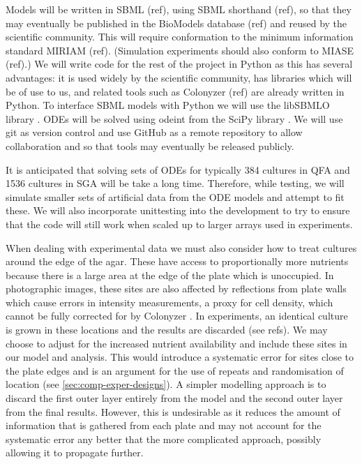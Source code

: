 Models will be written in SBML (ref), using SBML shorthand (ref), so
that they may eventually be published in the BioModels database (ref)
and reused by the scientific community. This will require conformation
to the minimum information standard MIRIAM (ref). (Simulation
experiments should also conform to MIASE (ref).) We will write code
for the rest of the project in Python as this has several advantages:
it is used widely by the scientific community, has libraries which
will be of use to us, and related tools such as Colonyzer (ref) are
already written in Python. To interface SBML models with Python we
will use the libSBMLO library \citep{Bornstein2008}. ODEs will be
solved using odeint from the SciPy library \citep{SciPy}. We will use
git as version control and use GitHub as a remote repository to allow
collaboration and so that tools may eventually be released publicly.

It is anticipated that solving sets of ODEs for typically 384 cultures
in QFA and 1536 cultures in SGA will be take a long time. Therefore,
while testing, we will simulate smaller sets of artificial data from
the ODE models and attempt to fit these. We will also incorporate
unittesting into the development to try to ensure that the code will
still work when scaled up to larger arrays used in experiments.

When dealing with experimental data we must also consider how to treat
cultures around the edge of the agar. These have access to
proportionally more nutrients because there is a large area at the
edge of the plate which is unoccupied. In photographic images, these
sites are also affected by reflections from plate walls which cause
errors in intensity measurements, a proxy for cell density, which
cannot be fully corrected for by Colonyzer \citep{Lawless2010}. In
experiments, an identical culture is grown in these locations and the
results are discarded (see refs). We may choose to adjust for the
increased nutrient availability and include these sites in our model
and analysis. This would introduce a systematic error for sites close
to the plate edges and is an argument for the use of repeats and
randomisation of location (see \ref{sec:comp-exper-designs}). A
simpler modelling approach is to discard the first outer layer
entirely from the model and the second outer layer from the final
results. However, this is undesirable as it reduces the amount of
information that is gathered from each plate and may not account for
the systematic error any better that the more complicated approach,
possibly allowing it to propagate further.

